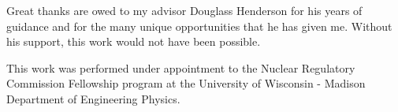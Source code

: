 Great thanks are owed to my advisor Douglass Henderson for his years of guidance and for the many unique opportunities that he has given me. Without his support, this work would not have been possible.

This work was performed under appointment to the Nuclear Regulatory Commission Fellowship program at the University of Wisconsin - Madison Department of Engineering Physics.
